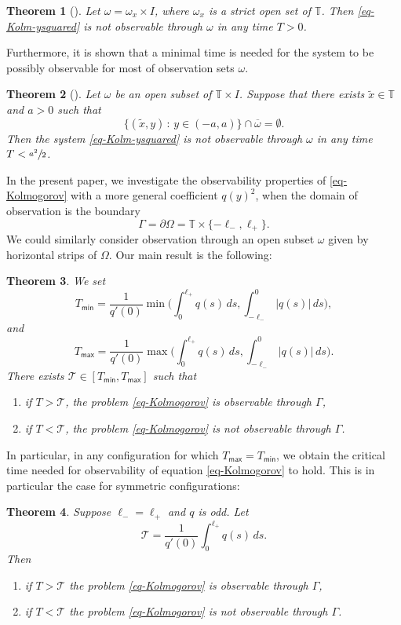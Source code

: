 \documentclass[JEP,XML,SOM,Unicode]{cedram}
\let\mathcal\mathscr
\theoremstyle{plain}
\newtheorem{theorem}{{Theorem}}[section]
\theoremstyle{definition}
\newcommand{\1}{\mathds 1}
\newcommand{\st}{\,:\,}
\newcommand{\T}{\mathbb{T}}
\let\o\omega
\let\O\Omega
\newcommand{\Tc}{{\mathcal T}}
\newcommand{\Tmin}{T_{\mathsf{min}}}
\newcommand{\Tmax}{T_{\mathsf{max}}}
\begin{document}
\begin{theorem}[\cite{koenig18}] \label{th-AK1}
Let $\omega = \omega_x \times I$, where $\omega_x$ is a strict open set of $\T$.
Then \eqref{eq-Kolm-ysquared} is not observable through $\omega$ in any time $T>0$.
\end{theorem}

Furthermore, it is shown that a minimal time is needed for the system to be possibly observable for most of observation sets $\omega$.

\begin{theorem}[\cite{koenig18}] \label{th-AK2}
Let $\omega$ be an open subset of $\T \times I$. Suppose that there exists $\tilde x \in \T$ and $a > 0$ such that
\[\lbrace (\tilde x ,y)\st y \in (-a,a)\rbrace \cap \overline{\omega} = \emptyset.\]
Then the system \eqref{eq-Kolm-ysquared} is not observable through $\omega$ in any time $T< \sfrac{a^2}{2}$.
\end{theorem}

In the present paper, we investigate the observability properties of
\eqref{eq-Kolmogorov} with a more general coefficient $q(y)^2$, when the domain of observation is the boundary
\[
\Gamma = \partial \O = \T \times\lbrace -\ell_-, \ell_+\rbrace.
\]
We could similarly consider observation through an open subset $\o$ given by horizontal strips of $\O$. Our main result is the following:

\begin{theorem} \label{th-main}
We set
\[
\Tmin = \frac 1 {q'(0)} \min\biggl(\int_0^{\ell_+} q(s) \, ds , \int_{-\ell_-}^0 \vert q(s) \vert\, ds \biggr),
\]
and
\[
\Tmax = \frac 1 {q'(0)} \max\biggl(\int_0^{\ell_+} q(s) \, ds , \int_{-\ell_-}^0 \vert q(s) \vert\, ds \biggr).
\]
There exists $\Tc \in [\Tmin,\Tmax]$ such that
\begin{enumerate}
\item if $T > \Tc$, the problem \eqref{eq-Kolmogorov} is observable through $\Gamma$, \label{item-th-i}
\item if $T < \Tc$, the problem \eqref{eq-Kolmogorov} is not observable through $\Gamma$. \label{item-th-ii}
\end{enumerate}
\end{theorem}

In particular, in any configuration for which $\Tmax=\Tmin$, we obtain the critical time needed
for observability of equation \eqref{eq-Kolmogorov} to hold. This is in particular the case for symmetric configurations:

\begin{theorem} \label{th-cas-symetrique}
Suppose $\ell_- = \ell_+$ and $q$ is odd. Let
\[
\Tc = \frac{1}{q'(0)} \int_0^{\ell_+} q(s) \, ds.
\]
Then
\begin{enumerate}
\item if $T > \Tc$ the problem \eqref{eq-Kolmogorov} is observable through $\Gamma$,
\item if $T < \Tc$ the problem \eqref{eq-Kolmogorov} is not observable through $\Gamma$.
\end{enumerate}
\end{theorem}
\end{document}
